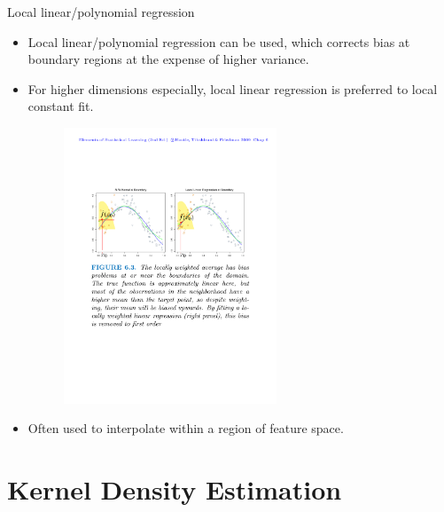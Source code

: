 \documentclass{beamer}
\begin{document}
\begin{frame}{Local linear/polynomial regression}
    \begin{itemize}
        \item Local linear/polynomial regression can be used, which corrects bias at boundary regions at the expense of higher variance. 
        \item For higher dimensions especially, local linear regression is preferred to local constant fit.
        \begin{figure}
            \centering
            \includegraphics[width=0.6\textwidth]{figures/localkernelregression.pdf}
        \end{figure}
        \item Often used to interpolate within a region of feature space.
    \end{itemize}
\end{frame}


\section{Kernel Density Estimation}
\end{document}
